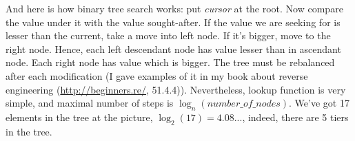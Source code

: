 And here is how binary tree search works: put \textit{cursor} at the root. Now compare the value under it with the value sought-after.
If the value we are seeking for is lesser than the current, take a move into left node. If it's bigger, move to the right node.
Hence, each left descendant node has value lesser than in 
ascendant node.
Each right node has value which is bigger.
The tree must be rebalanced after each modification (I gave examples of it in my book about reverse engineering (\url{http://beginners.re/}, 51.4.4)).
Nevertheless, lookup function is very simple, and maximal number of steps is $\log_n(number\_of\_nodes)$.
We've got 17 elements in the tree at the picture, $\log_2(17)=4.08...$, indeed, there are 5 tiers in the tree.

\levelup{}

